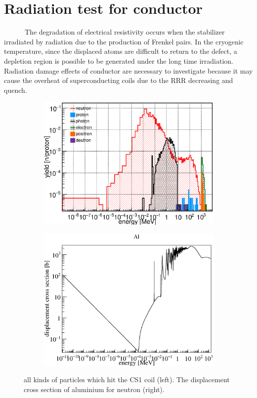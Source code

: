  \section{Radiation test for conductor}
~~~~~~The degradation of electrical resistivity occurs when the stabilizer irradiated by radiation due to the production of Frenkel pairs.
In the cryogenic temperature, since the displaced atoms are difficult to return to the defect, a depletion region is possible to be generated under the long time irradiation.
Radiation damage effects of conductor are necessary to investigate because it may cause the overheat of superconducting coils due to the RRR decreasing and quench.
\begin{figure}[H]
 \begin{subfigure}{0.3\textwidth}
  \centering
  \includegraphics[scale=0.45]{chapter4/fig/yield.eps}
 \end{subfigure}
 \hspace{0.2\textwidth}
 \begin{subfigure}{0.3\textwidth}
  \centering
  \includegraphics[scale=0.45]{chapter5/fig/AlDPA.eps}
 \end{subfigure}
 \caption{all kinds of particles which hit the CS1 coil (left). The displacement cross section of aluminium for neutron (right).}
 \label{3yield}
\end{figure}
